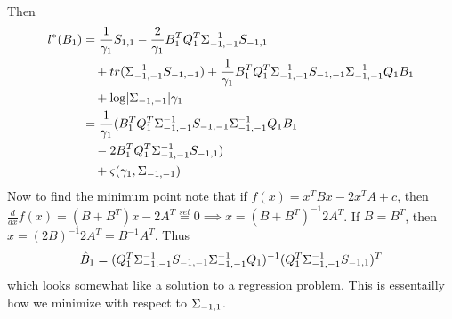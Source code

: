 \documentclass[12pt, leqno]{article}
\providecommand{\abs}[1]{\lvert#1\rvert}
\let\oldhat\hat
\renewcommand{\hat}[1]{\oldhat{{#1}}}
\def\s{\ensuremath\Sigma}
\begin{document}
\paragraph{} Then 
\begin{align*}
l^*(B_1) &=\frac{1}{\gamma_1} S_{1,1} -\frac{2}{\gamma_1} B_1^TQ_1^T
  \s_{-1,-1}^{-1} S_{-1,1} \\ 
&\quad +tr(\s_{-1,-1}^{-1}S_{-1,-1})
                                +\frac{1}{\gamma_1} 
B_1^TQ_1^T \s_{-1,-1}^{-1} S_{-1,-1} \s_{-1,-1}^{-1}
Q_1 B_1 \\ 
&\quad + \log \abs{\s_{-1,-1}}
  \gamma_1\\
&=\frac{1}{\gamma_1}(
B_1^TQ_1^T \s_{-1,-1}^{-1} S_{-1,-1} \s_{-1,-1}^{-1}
Q_1 B_1\\
&\quad -2 B_1^TQ_1^T \s_{-1,-1}^{-1} S_{-1,1}) \\
&\quad + \varsigma (\gamma_1, \s_{-1,-1})
\end{align*}
Now to find the minimum point note that if $f(x) = x^TBx - 2x^TA+c$, then $\frac{d}{dx} f(x) =
(B+B^T)x -2A^T \overset{set}{=} 0 \implies x = (B+B^T)^{-1} 2A^T$. If
$B = B^T$, then $x =  (2B)^{-1} 2A^T = B^{-1}A^T$. Thus 
\[
\hat{B}_1 = (Q_1^T \s_{-1,-1}^{-1} S_{-1,-1} \s_{-1,-1}^{-1}
Q_1)^{-1}(Q_1^T \s_{-1,-1}^{-1} S_{-1,1})^T
\]
which looks somewhat like a solution to a regression problem. This is
essentailly how we minimize with respect to $\s_{-1,1}$. 
\end{document}
